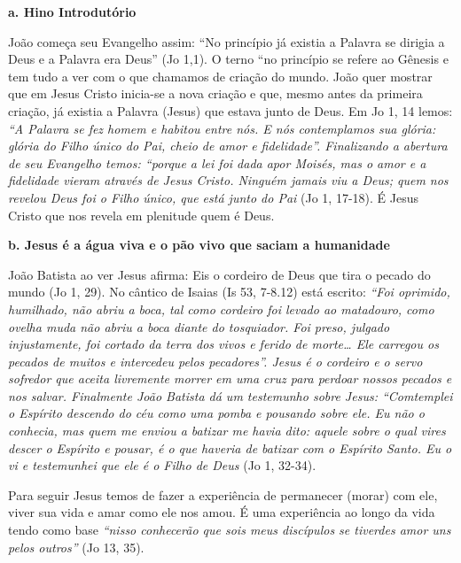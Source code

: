 \documentclass[
]{book}
\begin{document}
\textbf{a. Hino Introdutório}

João começa seu Evangelho assim: ``No princípio já existia a Palavra se dirigia a Deus e a Palavra era Deus'' (Jo 1,1). O terno ``no princípio se refere ao Gênesis e tem tudo a ver com o que chamamos de criação do mundo. João quer mostrar que em Jesus Cristo inicia-se a nova criação e que, mesmo antes da primeira criação, já existia a Palavra (Jesus) que estava junto de Deus. Em Jo 1, 14 lemos: \emph{``A Palavra se fez homem e habitou entre nós. E nós contemplamos sua glória: glória do Filho único do Pai, cheio de amor e fidelidade''. Finalizando a abertura de seu Evangelho temos: ``porque a lei foi dada apor Moisés, mas o amor e a fidelidade vieram através de Jesus Cristo. Ninguém jamais viu a Deus; quem nos revelou Deus foi o Filho único, que está junto do Pai} (Jo 1, 17-18). É Jesus Cristo que nos revela em plenitude quem é Deus.

\textbf{b. Jesus é a água viva e o pão vivo que saciam a humanidade}

João Batista ao ver Jesus afirma: Eis o cordeiro de Deus que tira o pecado do mundo (Jo 1, 29). No cântico de Isaias (Is 53, 7-8.12) está escrito: \emph{``Foi oprimido, humilhado, não abriu a boca, tal como cordeiro foi levado ao matadouro, como ovelha muda não abriu a boca diante do tosquiador. Foi preso, julgado injustamente, foi cortado da terra dos vivos e ferido de morte\ldots{} Ele carregou os pecados de muitos e intercedeu pelos pecadores''. Jesus é o cordeiro e o servo sofredor que aceita livremente morrer em uma cruz para perdoar nossos pecados e nos salvar. Finalmente João Batista dá um testemunho sobre Jesus: ``Comtemplei o Espírito descendo do céu como uma pomba e pousando sobre ele. Eu não o conhecia, mas quem me enviou a batizar me havia dito: aquele sobre o qual vires descer o Espírito e pousar, é o que haveria de batizar com o Espírito Santo. Eu o vi e testemunhei que ele é o Filho de Deus} (Jo 1, 32-34).

Para seguir Jesus temos de fazer a experiência de permanecer (morar) com ele, viver sua vida e amar como ele nos amou. É uma experiência ao longo da vida tendo como base \emph{``nisso conhecerão que sois meus discípulos se tiverdes amor uns pelos outros''} (Jo 13, 35).
\end{document}
